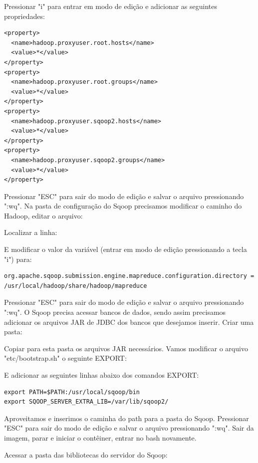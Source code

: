 \documentclass[a4paper,11pt]{article}
\begin{document}
Pressionar "i" para entrar em modo de edição e adicionar as seguintes propriedades:
\begin{lstlisting}[]
<property>
  <name>hadoop.proxyuser.root.hosts</name>
  <value>*</value>
</property>
<property>
  <name>hadoop.proxyuser.root.groups</name>
  <value>*</value>
</property>
<property>
  <name>hadoop.proxyuser.sqoop2.hosts</name>
  <value>*</value>
</property>
<property>
  <name>hadoop.proxyuser.sqoop2.groups</name>
  <value>*</value>
</property>
\end{lstlisting}

Pressionar "ESC" para sair do modo de edição e salvar o arquivo pressionando ":wq". Na pasta de configuração do Sqoop precisamos modificar o caminho do Hadoop, editar o arquivo: \\

Localizar a linha: \\

E modificar o valor da variável (entrar em modo de edição pressionando a tecla "i") para:
\begin{lstlisting}[]
org.apache.sqoop.submission.engine.mapreduce.configuration.directory = /usr/local/hadoop/share/hadoop/mapreduce
\end{lstlisting}

Pressionar "ESC" para sair do modo de edição e salvar o arquivo pressionando ":wq". O Sqoop precisa acessar bancos de dados, sendo assim precisamos adicionar os arquivos JAR de JDBC dos bancos que desejamos inserir. Criar uma pasta: \\

Copiar para esta pasta os arquivos JAR necessários. Vamos modificar o arquivo "etc/bootstrap.sh" o seguinte EXPORT: \\

E adicionar as seguintes linhas abaixo dos comandos EXPORT:
\begin{lstlisting}[]
export PATH=$PATH:/usr/local/sqoop/bin
export SQOOP_SERVER_EXTRA_LIB=/var/lib/sqoop2/
\end{lstlisting}

Aproveitamos e inserimos o caminha do path para a pasta do Sqoop. Pressionar "ESC" para sair do modo de edição e salvar o arquivo pressionando ":wq".  Sair da imagem, parar e iniciar o contêiner, entrar no bash novamente.

Acessar a pasta das bibliotecas do servidor do Sqoop: \\
\end{document}
